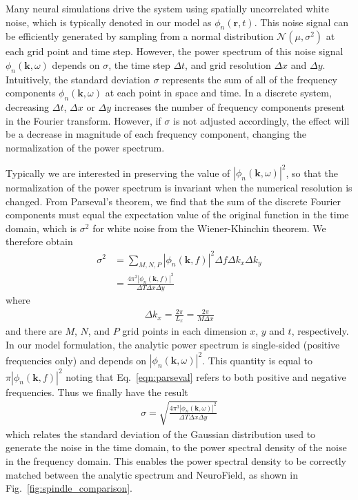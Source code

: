 \documentclass[preprint,review,10pt,authoryear,letterpaper]{elsarticle}
\begin{document}
Many neural simulations drive the system using spatially uncorrelated white noise, which is typically denoted in our model as $\phi_n(\mathbf{r},t)$. This noise signal can be efficiently generated by sampling from a normal distribution $\mathcal{N}(\mu,\sigma^2)$ at each grid point and time step. However, the power spectrum of this noise signal $\phi_n(\mathbf{k},\omega)$ depends on $\sigma$, the time step $\Delta t$, and grid resolution $\Delta x$ and $\Delta y$. Intuitively, the standard deviation $\sigma$ represents the sum of all of the frequency components $\phi_n(\mathbf{k},\omega)$ at each point in space and time. In a discrete system, decreasing $\Delta t$, $\Delta x$ or $\Delta y$ increases the number of frequency components present in the Fourier transform. However, if $\sigma$ is not adjusted accordingly, the effect will be a decrease in magnitude of each frequency component, changing the normalization of the power spectrum. 

Typically we are interested in preserving the value of $|\phi_n(\mathbf{k},\omega)|^2$, so that the normalization of the power spectrum is invariant when the numerical resolution is changed. From Parseval's theorem, we find that the sum of the discrete Fourier components must equal the expectation value of the original function in the time domain, which is $\sigma^{2}$ for white noise from the Wiener-Khinchin theorem. We therefore obtain 
\begin{align}
\label{eqn:parseval}
\sigma^{2}&=\sum_{M,N,P}|\phi_n(\mathbf{k},f)|^2\Delta f\Delta k_{x}\Delta k_{y}\\
&=\frac{4\pi^{2}|\phi_n(\mathbf{k},f)|^2}{\Delta T\Delta x\Delta y}
\end{align}
where
\begin{align}
\Delta k_x=\frac{2\pi}{L_{x}}=\frac{2\pi}{M\Delta x}
\end{align}
and there are $M$, $N$, and $P$ grid points in each dimension $x$, $y$ and $t$, respectively. In our model formulation, the analytic power spectrum is single-sided (positive frequencies only) and depends on $|\phi_n(\mathbf{k},\omega)|^2$. This quantity is equal to $\pi |\phi_n(\mathbf{k},f)|^2$  noting that Eq.~\eqref{eqn:parseval} refers to both positive and negative frequencies. Thus we finally have the result
\begin{align}
\sigma=\sqrt{\frac{4\pi^{3}|\phi_n(\mathbf{k},\omega)|^2}{\Delta T\Delta x\Delta y}}
\end{align}
which relates the standard deviation of the Gaussian distribution used to generate the noise in the time domain, to the power spectral density of the noise in the frequency domain. This enables the power spectral density to be correctly matched between the analytic spectrum and NeuroField, as shown in Fig.~\ref{fig:spindle_comparison}. 
\end{document}
